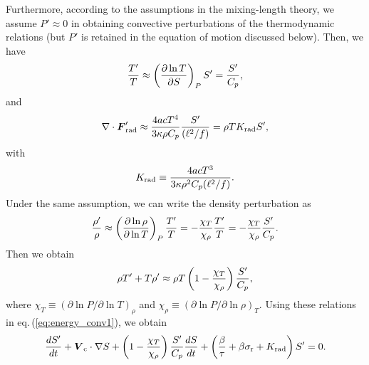 \documentclass[fleqn,usenatbib]{mnras}
\def\bm#1{\mbox{\boldmath$#1$}}
\begin{document}
Furthermore, according to the assumptions in the mixing-length theory, 
we assume $P' \approx 0$ in obtaining convective perturbations of 
the thermodynamic relations 
(but $P'$ is retained in the equation of motion discussed below). 
Then, we have
\begin{equation}
{T'\over T} \approx \left(\partial\ln T\over\partial S\right)_P S' = {S'\over C_p},
\end{equation}
and
\begin{equation}
\nabla\cdot\bm{F}'_{\rm rad} 
\approx {4acT^4\over 3\kappa\rho C_p}{S'\over (\ell^2/f)}
=\rho TK_{\rm rad}S', 
\end{equation} 
with
\begin{equation}
K_{\rm rad}\equiv {4acT^3\over 3\kappa\rho^2 C_p (\ell^2/f)}.
\label{eq:Krad}
\end{equation}
Under the same assumption, we can write the density perturbation as 
\begin{equation}
{\rho'\over\rho} \approx 
\left(\partial\ln\rho\over\partial\ln T\right)_P{T'\over T} =
-{\chi_T\over\chi_\rho}{T'\over T} = -{\chi_T\over\chi_\rho}{S'\over C_p}.
\label{eq:rhoS}
\end{equation}
Then we obtain
\begin{equation}
\rho T' + T\rho' \approx \rho T\left(1-{\chi_T\over\chi_\rho}\right)
{S'\over C_p}, 
\end{equation}
where $\chi_T\equiv(\partial\ln P/\partial\ln T)_\rho$ and
$\chi_\rho\equiv(\partial\ln P/\partial\ln\rho)_T$.
Using these relations in eq.\,(\ref{eq:energy_conv1}), we obtain
\begin{equation}
{dS'\over dt} +\bm{V}_{\rm c}\cdot\nabla S 
+ \left(1-{\chi_T\over\chi_\rho}\right){S'\over C_p}{dS\over dt} 
+\left({\beta\over\tau}+\beta\sigma_{\rm r}+K_{\rm rad}\right)S'
=0.
\label{eq:energy_conv2}
\end{equation} 
\end{document}
